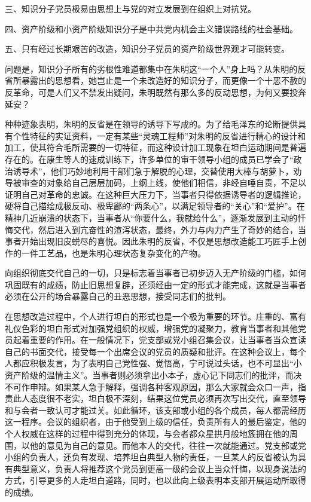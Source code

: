 三、知识分子党员极易由思想上与党的对立发展到在组织上对抗党。

四、资产阶级和小资产阶级知识分子是中共党内机会主义错误路线的社会基础。

五、只有经过长期艰苦的改造，知识分子党员的资产阶级世界观才可能转变。

问题是，知识分子所有的劣根性难道都集中在朱明这“一个人”身上吗？从朱明的反省所暴露出的思想看，她岂止是一个未改造好的知识分子，而更像一个十恶不赦的反革命，可是人们又不禁发出疑问，朱明既然有那么多的反动思想，为何又要投奔延安？

种种迹象表明，朱明的反省是在领导的诱导下写成的。为了给毛泽东的论断提供具有个性特征的实证资料，一定有某些“灵魂工程师”对朱明的反省进行精心的设计和加工，使其符合毛所需要的一切特征，而这种设计加工现象在坦白运动期间是普遍存在的。在康生等人的速成训练下，许多单位的审干领导小组的成员已学会了“政治诱导术”，他们巧妙地利用干部们急于解脱的心理，交替使用大棒与胡萝卜，劝导被审查的对象给自己层层加码，上纲上线，使他们相信，非经自唾自责，不足以证明自己对革命的忠诚。在这种巨大压力下，当事者只得依据诱导者的逻辑推论，硬将自己描绘成极反动、极卑鄙的“两条心”，以满足领导者的“关心”和“爱护”。在精神几近崩溃的状态下，当事者从“你要什么，我就给什么”，逐渐发展到主动的忏悔交代，然后进入到亢奋性的渲泻状态，最终，外力与内力产生了奇妙的结合，当事者开始出现旧皮蜕尽的喜悦。因此朱明的反省，不仅是思想改造能工巧匠手上创作的一件工艺品，也是朱明心理状态复杂变化的产物。

向组织彻底交代自己的一切，只是标志着当事者已初步迈入无产阶级的门槛，如何巩固既有的成绩，防止旧思想复辟，还须经由一定的形式才能完成，这就是当事者必须在公开的场合暴露自己的丑恶思想，接受同志们的批判。

在思想改造过程中，个人进行坦白的形式也是一个极为重要的环节。庄重的、富有礼仪色彩的坦白形式对加强党组织的权威，增强党的凝聚力，教育当事者和其他党员起着重要的作用。在一般情况下，党支部或党小组召集会议，让当事者当众宣读自己的书面交代，接受每一个出席会议的党员的质疑和批评。在这种会议上，每个人都应积极发言，为了表明自己党性强、觉悟高，宁可说过头话，也不可显出“小资产阶级的温情主义”。当事者则必须拿出小本子，虚心记下同志们的批评，而决不可作申辩。如果某人急于解释，强调各种客观原因，那么大家就会众口一声，指责此人态度很不老实，坦白极不深刻，结果这位党员必须再次写出交代，直至领导和与会者一致认可才能过关。如此循环，该支部或小组的各个成员，每人都需经历这一程序。会议的组织者，由于他受到上级的信任，负责所有人的最后鉴定，他的个人权威在这样的过程中得到充分的体现，与会者都众星拱月般地簇拥在他的周围，以他的意见为自己的意见。而他本人的交代，往往一次就能通过。党支部或党小组的负责人，还负有发现、培养坦白典型人物的责任，一旦某人的反省被认为具有典型意义，负责人将推荐这个党员到更高一级的会议上当众忏悔，以现身说法的方式，引导更多的人走坦白道路，同时，也以此向上级表明本支部开展运动所取得的成绩。


